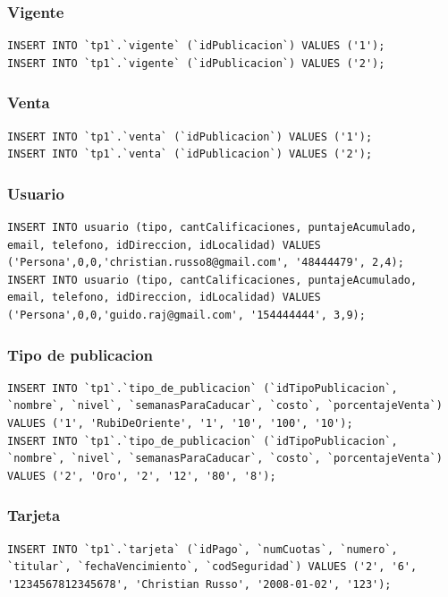 \documentclass[a4paper, 10pt, twoside]{article}
\begin{document}
\subsubsection{Vigente}
\begin{verbatim}
INSERT INTO `tp1`.`vigente` (`idPublicacion`) VALUES ('1');
INSERT INTO `tp1`.`vigente` (`idPublicacion`) VALUES ('2');
\end{verbatim}
\subsubsection{Venta}
\begin{verbatim}
INSERT INTO `tp1`.`venta` (`idPublicacion`) VALUES ('1');
INSERT INTO `tp1`.`venta` (`idPublicacion`) VALUES ('2');
\end{verbatim}

\subsubsection{Usuario}
\begin{verbatim}
INSERT INTO usuario (tipo, cantCalificaciones, puntajeAcumulado, email, telefono, idDireccion, idLocalidad) VALUES ('Persona',0,0,'christian.russo8@gmail.com', '48444479', 2,4);
INSERT INTO usuario (tipo, cantCalificaciones, puntajeAcumulado, email, telefono, idDireccion, idLocalidad) VALUES ('Persona',0,0,'guido.raj@gmail.com', '154444444', 3,9);

\end{verbatim}
\subsubsection{Tipo de publicacion}
\begin{verbatim}
INSERT INTO `tp1`.`tipo_de_publicacion` (`idTipoPublicacion`, `nombre`, `nivel`, `semanasParaCaducar`, `costo`, `porcentajeVenta`) VALUES ('1', 'RubiDeOriente', '1', '10', '100', '10');
INSERT INTO `tp1`.`tipo_de_publicacion` (`idTipoPublicacion`, `nombre`, `nivel`, `semanasParaCaducar`, `costo`, `porcentajeVenta`) VALUES ('2', 'Oro', '2', '12', '80', '8');

\end{verbatim}
\subsubsection{Tarjeta}
\begin{verbatim}
INSERT INTO `tp1`.`tarjeta` (`idPago`, `numCuotas`, `numero`, `titular`, `fechaVencimiento`, `codSeguridad`) VALUES ('2', '6', '1234567812345678', 'Christian Russo', '2008-01-02', '123');

\end{verbatim}
\end{document}
